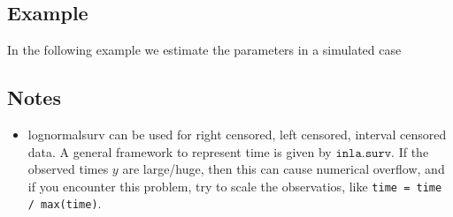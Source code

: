 \documentclass[a4paper,11pt]{article}
\begin{document}
\subsection*{Example}

In the following example we estimate the parameters in a simulated
case 

\subsection*{Notes}

\begin{itemize}
\item lognormalsurv can be used for right censored, left censored,
    interval censored data. A general framework to represent time is
    given by $\texttt{inla.surv}$. If the observed times $y$ are
    large/huge, then this can cause numerical overflow, and if you
    encounter this problem, try to scale the observatios, like
    \verb|time = time / max(time)|.
\end{itemize}
\end{document}
